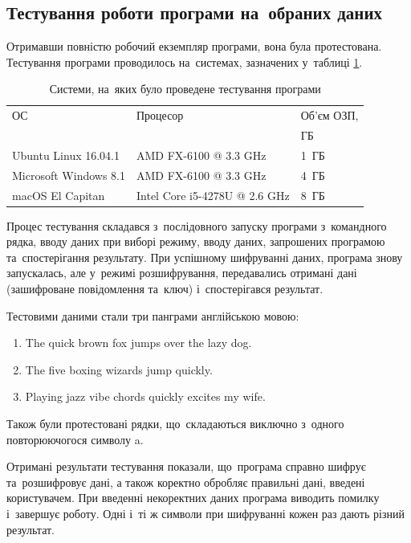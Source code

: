 \documentclass[a4paper,oneside,titlepage,14pt]{extarticle}
\begin{document}
			\subsection{Тестування роботи програми на~обраних даних}
				Отримавши повністю робочий екземпляр програми, вона була протестована. Тестування програми проводилось на~системах, зазначених у~таблиці \ref{tab:testsystems}.
				\begin{table}[h]
					\centering
					\begin{tabular}{lll}
						\toprule
							ОС & Процесор & Об'єм ОЗП,\\
							& &ГБ \\
						\midrule
							Ubuntu Linux 16.04.1 & AMD FX-6100 @ 3.3 GHz & 1~ГБ \\
							Microsoft Windows 8.1 & AMD FX-6100 @ 3.3 GHz & 4~ГБ \\
							macOS El Capitan & Intel Core i5-4278U @ 2.6 GHz & 8~ГБ\\
						\bottomrule
					\end{tabular}
					\caption{Системи, на~яких було проведене тестування програми}
					\label{tab:testsystems}
				\end{table}\par
				Процес тестування складався з~послідовного запуску програми з~командного рядка, вводу даних при виборі режиму, вводу даних, запрошених програмою та~спостерігання результату. При успішному шифруванні даних, програма знову запускалась, але у~режимі розшифрування, передавались отримані дані (зашифроване повідомлення та~ключ) і~спостерігався результат.\par
				Тестовими даними стали три панграми англійською мовою:
				\begin{enumerate}
					\item The quick brown fox jumps over the lazy dog.
					\item The five boxing wizards jump quickly.
					\item Playing jazz vibe chords quickly excites my wife.
				\end{enumerate} \par
				Також були протестовані рядки, що~складаються виключно з~одного повторюючогося символу a.\par
				Отримані результати тестування показали, що~програма справно шифрує та~розшифровує дані, а також коректно обробляє правильні дані, введені користувачем. При введенні некоректних даних програма виводить помилку і~завершує роботу. Одні і~ті ж символи при шифруванні кожен раз дають різний результат.\par
	\newpage
\end{document}
